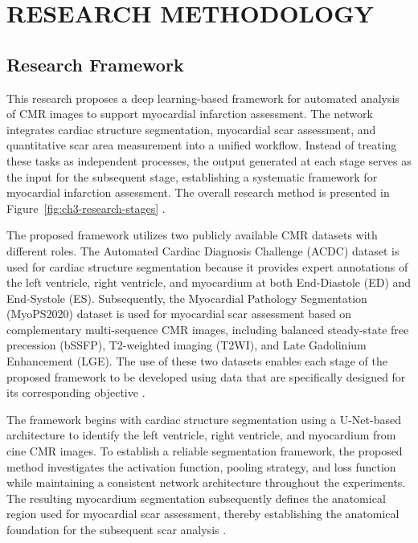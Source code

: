 \chapter{RESEARCH METHODOLOGY}
\label{chap:3}

\section{Research Framework}
\label{sec:research-framework}

This research proposes a deep learning-based framework for automated analysis of CMR images to support myocardial infarction assessment. The network integrates cardiac structure segmentation, myocardial scar assessment, and quantitative scar area measurement into a unified workflow. Instead of treating these tasks as independent processes, the output generated at each stage serves as the input for the subsequent stage, establishing a systematic framework for myocardial infarction assessment. The overall research method is presented in Figure~\ref{fig:ch3-research-stages} \citep{Ronneberger2015,Bernard2018,Zhuang2020}.

The proposed framework utilizes two publicly available CMR datasets with different roles. The Automated Cardiac Diagnosis Challenge (ACDC) dataset is used for cardiac structure segmentation because it provides expert annotations of the left ventricle, right ventricle, and myocardium at both End-Diastole (ED) and End-Systole (ES). Subsequently, the Myocardial Pathology Segmentation (MyoPS2020) dataset is used for myocardial scar assessment based on complementary multi-sequence CMR images, including balanced steady-state free precession (bSSFP), T2-weighted imaging (T2WI), and Late Gadolinium Enhancement (LGE). The use of these two datasets enables each stage of the proposed framework to be developed using data that are specifically designed for its corresponding objective \citep{Bernard2018,Zhuang2020}.

The framework begins with cardiac structure segmentation using a U-Net-based architecture to identify the left ventricle, right ventricle, and myocardium from cine CMR images. To establish a reliable segmentation framework, the proposed method investigates the activation function, pooling strategy, and loss function while maintaining a consistent network architecture throughout the experiments. The resulting myocardium segmentation subsequently defines the anatomical region used for myocardial scar assessment, thereby establishing the anatomical foundation for the subsequent scar analysis \citep{Ronneberger2015,Diamantis2020,Riandini2025Array}.

